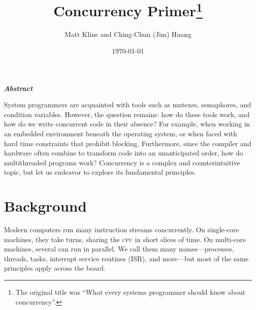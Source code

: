 \documentclass[fontsize=10pt, oneside]{scrartcl}
\title{Concurrency Primer\footnote{The original title was ``What every systems programmer should know about concurrency''.}}
\author{Matt Kline and Ching-Chun (Jim) Huang}
\date{\today}
\makeatletter
\let\runauthor\@author
\let\rundate\@date
\let\runtitle\@title
\makeatother
\begin{document}
\begin{center}
\Large \runtitle
\bigskip

\large
\runauthor
\smallskip

\normalsize
\rundate
\end{center}
\bigskip

\begin{center}
\large \bfseries\itshape Abstract
\end{center}
\smallskip

\noindent
System programmers are acquainted with tools such as mutexes, semaphores, and condition variables.
However, the question remains: how do these tools work, and how do we write concurrent code in their absence?
For example, when working in an embedded environment beneath the operating system,
or when faced with hard time constraints that prohibit blocking.
Furthermore, since the compiler and hardware often combine to transform code into an unanticipated order,
how do multithreaded programs work? Concurrency is a complex and counterintuitive topic,
but let us endeavor to explore its fundamental principles.
\bigskip

\section{Background}
\label{background}

Modern computers run many instruction streams concurrently.
On single-core machines, they take turns, sharing the \textsc{cpu} in short slices of time.
On multi-core machines, several can run in parallel.
We call them many names---processes, threads, tasks, interrupt service routines (ISR),
and more---but most of the same principles apply across the board.
\end{document}
